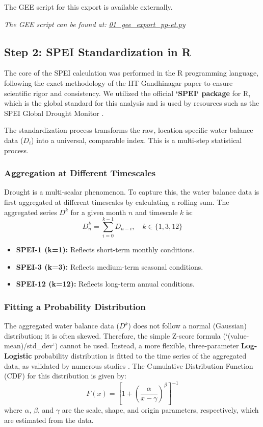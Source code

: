 \documentclass[12pt, a4paper]{article}
\begin{document}
The GEE script for this export is available externally.
\begin{center}
    \textit{The GEE script can be found at: \href{https://github.com/Actuallyanonymous/spei-drought-analysis-pipeline/blob/main/scripts/01_gee_export_pp-et.py}{01\_gee\_export\_pp-et.py}}
\end{center}

\subsection{Step 2: SPEI Standardization in R}
The core of the SPEI calculation was performed in the R programming language, following the exact methodology of the IIT Gandhinagar paper \cite{mishra2023spei} to ensure scientific rigor and consistency. We utilized the official \textbf{`SPEI` package} for R, which is the global standard for this analysis and is used by resources such as the SPEI Global Drought Monitor \cite{spei_csic}.

The standardization process transforms the raw, location-specific water balance data ($D_i$) into a universal, comparable index. This is a multi-step statistical process.

\subsubsection{Aggregation at Different Timescales}
Drought is a multi-scalar phenomenon. To capture this, the water balance data is first aggregated at different timescales by calculating a rolling sum. The aggregated series $D^k$ for a given month $n$ and timescale $k$ is:
\[ D^k_n = \sum_{i=0}^{k-1} D_{n-i}, \quad k \in \{1, 3, 12\} \]
\begin{itemize}
    \item \textbf{SPEI-1 (k=1):} Reflects short-term monthly conditions.
    \item \textbf{SPEI-3 (k=3):} Reflects medium-term seasonal conditions.
    \item \textbf{SPEI-12 (k=12):} Reflects long-term annual conditions.
\end{itemize}

\subsubsection{Fitting a Probability Distribution}
The aggregated water balance data ($D^k$) does not follow a normal (Gaussian) distribution; it is often skewed. Therefore, the simple Z-score formula (`(value-mean)/std\_dev`) cannot be used. Instead, a more flexible, three-parameter \textbf{Log-Logistic} probability distribution is fitted to the time series of the aggregated data, as validated by numerous studies \cite{vicente2010multiscalar, stagge2015candidate}. The Cumulative Distribution Function (CDF) for this distribution is given by:
\[ F(x) = \left[1 + \left(\frac{\alpha}{x-\gamma}\right)^\beta\right]^{-1} \]
where $\alpha$, $\beta$, and $\gamma$ are the scale, shape, and origin parameters, respectively, which are estimated from the data.
\end{document}
